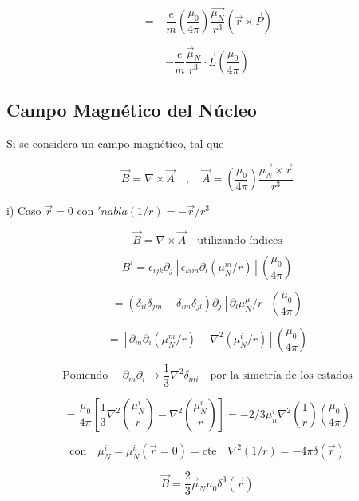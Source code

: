 \documentclass{report}
\begin{document}
\[= - \frac{e}{m} (\frac{\mu _0 }{4 \pi }) \frac{\overrightarrow{\mu _N }}{r^3 } (\overrightarrow{r} \times \overrightarrow{P}) \]

\begin{equation}
- \frac{e}{m} \frac{\overrightarrow{\mu}_{N}}{r^3 } \cdot \overrightarrow{L} (\frac{\mu_0 }{4 \pi })
\end{equation}


\subsection{Campo Magn\'etico del N\'ucleo }

Si se considera un campo magn\'etico, tal que

\[\overrightarrow{B} = \nabla \times \overrightarrow{A} \quad , \quad \overrightarrow{A} = (\frac{\mu_0 }{4 \pi }) \frac{\overrightarrow{\mu _{N}} \times \overrightarrow{r}}{r^3 }\]

i) Caso $\overrightarrow{r} = 0$ con $'nabla (1/r) = - \overrightarrow{r} / r^3 $

\[\overrightarrow{B} = \nabla \times \overrightarrow{A} \quad \text{utilizando índices}\]

\[B^{i} = \epsilon _{ijk} \partial_{j} [\epsilon _{klm} \partial_l (\mu _{N}^{m}/r)] (\frac{\mu_0 }{4 \pi})\]

\[= (\delta _{il} \delta_{jm} - \delta_{im} \delta_{jl}) \partial_j [\partial_{l} \mu_{N}^{\mu}/r] (\frac{\mu_0 }{4 \pi })\]

\[= [ \partial _m \partial_i (\mu_{N}^{m}/r) - \nabla^2 (\mu_{N}^{i}/r)] (\frac{\mu _0 }{4 \pi})\]

\[\text{Poniendo } \quad \partial_m \partial_i \rightarrow \frac{1}{3} \nabla ^2 \delta _{mi} \quad \text{por la simetría de los estados}\]

\[= \frac{\mu_0 }{4 \pi} [\frac{1}{3} \nabla^2 (\frac{\mu_{N}^{i}}{r}) - \nabla^2 (\frac{\mu_{N}^{i}}{r})] = - 2/3 \mu_{n}^{i} \nabla^2 (\frac{1}{r}) (\frac{\mu_0 }{4 \pi})\]

\[\text{con} \quad \mu _{N}^{i} = \mu_{N}^{i} (\overrightarrow{r} = 0) = \text{cte} \quad \nabla^2 (1/r) = - 4 \pi \delta (\overrightarrow{r}) \]

\begin{equation}
\overrightarrow{B} = \frac{2}{3} \overrightarrow{\mu}_{N} \mu _0 \delta^3 (\overrightarrow{r}) 
\end{equation}
\end{document}

